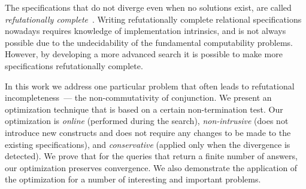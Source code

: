 The specifications that do not diverge even when no solutions exist, are called \emph{refutationally complete}~\cite{WillThesis}. Writing 
refutationally complete relational specifications nowadays requires knowledge of \miniKanren implementation intrinsics, and is not always
possible due to the undecidability of the fundamental computability problems. However, by developing a more advanced search it is possible
to make more specifications refutationally complete.

In this work we address one particular problem that often leads to refutational incompleteness~--- the non-commutativity of
conjunction. We present an optimization technique that is based on a certain non-termination test. Our optimization
is \emph{online} (performed during the search), \emph{non-intrusive} (does not introduce new constructs and does not require
any changes to be made to the existing specifications), and \emph{conservative} (applied only when the divergence
is detected). We prove that for the queries that return a finite number of answers, our optimization preserves convergence. 
We also demonstrate the application of the optimization for a number of interesting and important problems.
